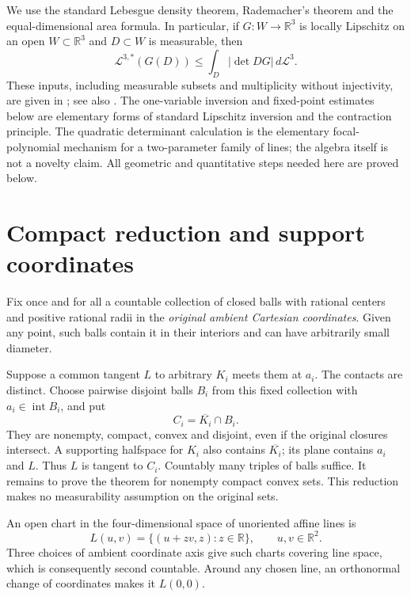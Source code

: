\documentclass[11pt]{article}
\newcommand{\R}{\mathbb R}
\newcommand{\Leb}{\mathcal L}
\DeclareMathOperator{\intt}{int}
\theoremstyle{remark}
\begin{document}
We use the standard Lebesgue density theorem, Rademacher's theorem and the equal-dimensional area formula. In particular, if $G:W\to\R^3$ is locally Lipschitz on an open $W\subset\R^3$ and $D\subset W$ is measurable, then
\begin{equation}\label{eq:area}
\Leb^{3,*}(G(D))\le\int_D |\det DG|\,d\Leb^3.
\end{equation}
These inputs, including measurable subsets and multiplicity without injectivity, are given in \cite[Ch.~1, Cor.~3.10; Ch.~2, Thms.~1.4 and~3.3]{simon}; see also \cite{federer,evansgariepy}. The one-variable inversion and fixed-point estimates below are elementary forms of standard Lipschitz inversion and the contraction principle. The quadratic determinant calculation is the elementary focal-polynomial mechanism for a two-parameter family of lines; the algebra itself is not a novelty claim. All geometric and quantitative steps needed here are proved below.

\section{Compact reduction and support coordinates}
Fix once and for all a countable collection of closed balls with rational centers and positive rational radii in the \emph{original ambient Cartesian coordinates}. Given any point, such balls contain it in their interiors and can have arbitrarily small diameter.

Suppose a common tangent $L$ to arbitrary $K_i$ meets them at $a_i$. The contacts are distinct. Choose pairwise disjoint balls $B_i$ from this fixed collection with $a_i\in\intt B_i$, and put
\[
C_i=\overline{K_i}\cap B_i.
\]
They are nonempty, compact, convex and disjoint, even if the original closures intersect. A supporting halfspace for $K_i$ also contains $\overline{K_i}$; its plane contains $a_i$ and $L$. Thus $L$ is tangent to $C_i$. Countably many triples of balls suffice. It remains to prove the theorem for nonempty compact convex sets. This reduction makes no measurability assumption on the original sets.

An open chart in the four-dimensional space of unoriented affine lines is
\begin{equation}\label{eq:lines}
L(u,v)=\{(u+zv,z):z\in\R\},\qquad u,v\in\R^2.
\end{equation}
Three choices of ambient coordinate axis give such charts covering line space, which is consequently second countable. Around any chosen line, an orthonormal change of coordinates makes it $L(0,0)$.
\end{document}
